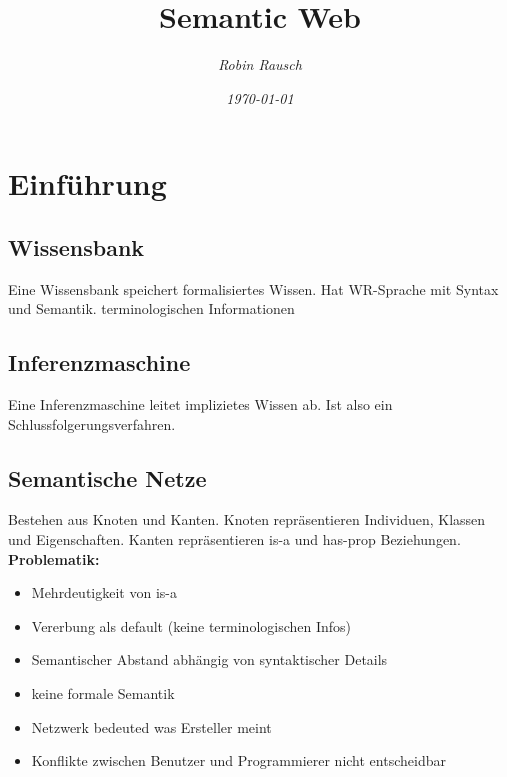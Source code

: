 \documentclass[12pt,a4paper]{article}
\title{Semantic Web}
\author{\slshape Robin Rausch}
\date{\slshape \today}
\begin{document}
\maketitle
\tableofcontents
\newpage
{}

\section{Einführung}
	\subsection{Wissensbank}
		Eine Wissensbank speichert formalisiertes Wissen. Hat WR-Sprache mit Syntax und Semantik. terminologischen Informationen

	\subsection{Inferenzmaschine}
		Eine Inferenzmaschine leitet implizietes Wissen ab. Ist also ein Schlussfolgerungsverfahren.

	\subsection{Semantische Netze}
		Bestehen aus Knoten und Kanten. Knoten repräsentieren Individuen, Klassen und Eigenschaften. Kanten repräsentieren is-a und has-prop Beziehungen.\\
		\textbf{Problematik:}
		\begin{itemize}
			\item Mehrdeutigkeit von is-a
			\item Vererbung als default (keine terminologischen Infos)
			\item \glqq Semantischer Abstand\grqq{} abhängig von syntaktischer Details
			\item keine formale Semantik
			\item Netzwerk bedeuted was Ersteller meint
			\item Konflikte zwischen Benutzer und Programmierer nicht entscheidbar
		\end{itemize}
\end{document}
